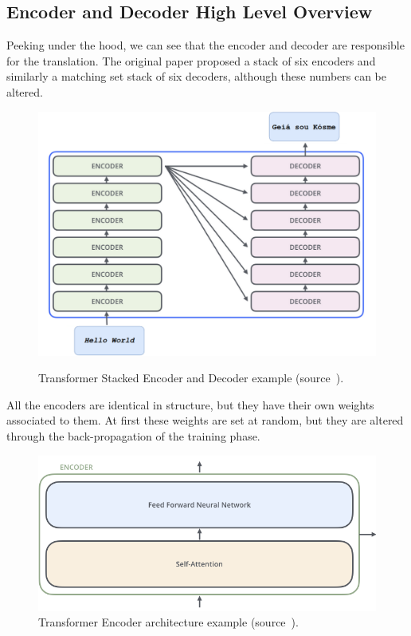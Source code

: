 \subsection{Encoder and Decoder High Level Overview}
Peeking under the hood, we can see that the encoder and decoder are responsible for the translation. The original paper proposed a stack of
six encoders and similarly a matching set stack of six decoders, although these numbers can be altered.
\begin{figure}[H]
	\centering
	\includegraphics[width=0.9\linewidth]{figures/transformer_stacked_encoder_decoder.png}
	\label{fig:transformer_stacked_encoder_decoder}
	\caption{Transformer Stacked Encoder and Decoder example (source~\autocite{alammarIllustratedTransformer}).}
\end{figure}
All the encoders are identical in structure, but they have their own weights associated to them. At first these weights are set at random, but they are
altered through the back-propagation of the training phase.
\begin{figure}[H]
	\centering
	\includegraphics[width=0.8\linewidth]{figures/encoder_architecture.png}
	\caption{Transformer Encoder architecture example (source~\autocite{alammarIllustratedTransformer}).}
	\label{fig:transformer_encoder}
\end{figure}
